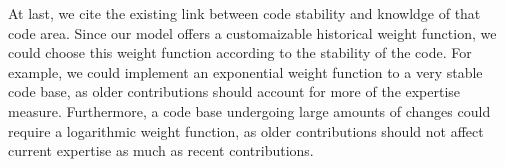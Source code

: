 At last, we cite the existing link between code stability and knowldge of that code area. Since our model offers a customaizable historical weight function, we could choose this weight function according to the stability of the code. For example, we could implement an exponential weight function to a very stable code base, as older contributions should account for more of the expertise measure. Furthermore, a code base undergoing large amounts of changes could require a logarithmic weight function, as older contributions should not affect current expertise as much as recent contributions. 



